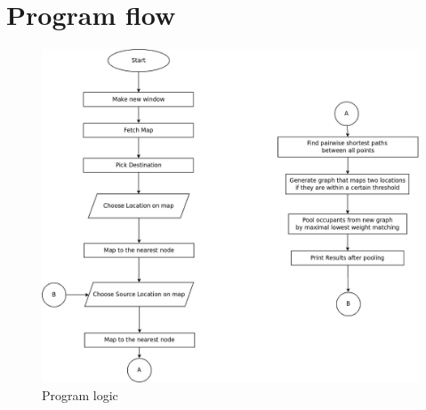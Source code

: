 \documentclass[main.tex]{subfiles}
\begin{document}
\section{Program flow}
\begin{figure}[H]
  \centering
  \includegraphics[width=0.8\linewidth]{Flow3.jpeg}
  \caption{Program logic}
  \label{fig:flow}
\end{figure}
\end{document}
